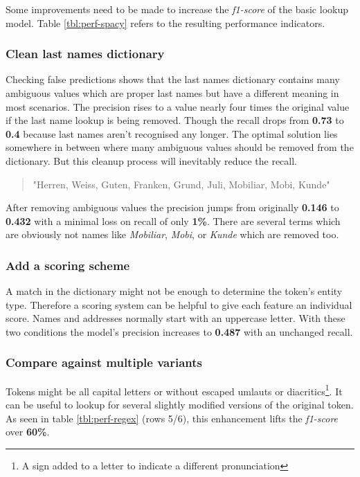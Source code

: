 Some improvements need to be made to increase the \emph{f1-score} of the basic lookup model. Table \ref{tbl:perf-spacy} refers to the resulting performance indicators.

\subsubsection{Clean last names dictionary}

Checking false predictions shows that the last names dictionary contains many ambiguous values which are proper last names but have a different meaning in most scenarios. The precision rises to a value nearly four times the original value if the last name lookup is being removed. Though the recall drops from \textbf{0.73} to \textbf{0.4} because last names aren't recognised any longer. The optimal solution lies somewhere in between where many ambiguous values should be removed from the dictionary. But this cleanup process will inevitably reduce the recall.

\begin{quote}
    "Herren, Weiss, Guten, Franken, Grund, Juli, Mobiliar, Mobi, Kunde"
\end{quote}

After removing ambiguous values the precision jumps from originally \textbf{0.146} to \textbf{0.432} with a minimal loss on recall of only \textbf{1\%}. There are several terms which are obviously not names like \emph{Mobiliar}, \emph{Mobi}, or \emph{Kunde} which are removed too.

\subsubsection{Add a scoring scheme}

A match in the dictionary might not be enough to determine the token's entity type. Therefore a scoring system can be helpful to give each feature an individual score. Names and addresses normally start with an uppercase letter. With these two conditions the model's precision increases to \textbf{0.487} with an unchanged recall. 

\subsubsection{Compare against multiple variants}

Tokens might be all capital letters or without escaped umlauts or diacritics\footnote{A sign added to a letter to indicate a different pronunciation}. It can be useful to lookup for several slightly modified versions of the original token. As seen in table \ref{tbl:perf-regex} (rows 5/6), this enhancement lifts the \emph{f1-score} over \textbf{60\%}.

